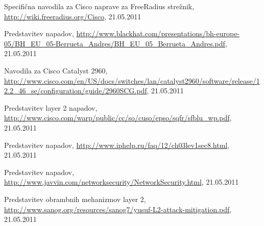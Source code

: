 \documentclass[12pt]{article}
\begin{document}
\begin{thebibliography}{9}
\bibitem{}
Specifična navodila za Cisco naprave za FreeRadius strežnik, \url{http://wiki.freeradius.org/Cisco}, 21.05.2011

\bibitem{}
Predstavitev napadov, \url{http://www.blackhat.com/presentations/bh-europe-05/BH_EU_05-Berrueta_Andres/BH_EU_05_Berrueta_Andres.pdf}, 21.05.2011

\bibitem{}
Navodila za Cisco Catalyst 2960, \url{http://www.cisco.com/en/US/docs/switches/lan/catalyst2960/software/release/12.2_46_se/configuration/guide/2960SCG.pdf}, 21.05.2011

\bibitem{}
Predstavitev layer 2 napadov, \url{http://www.cisco.com/warp/public/cc/so/cuso/epso/sqfr/sfblu_wp.pdf}, 21.05.2011

\bibitem{}
Predstavitev napadov, \url{http://www.iphelp.ru/faq/12/ch03lev1sec8.html}, 21.05.2011

\bibitem{}
Predstavitev napadov, \url{http://www.javvin.com/networksecurity/NetworkSecurity.html}, 21.05.2011

\bibitem{}
Predstavitev obrambnih mehanizmov layer 2, \url{http://www.sanog.org/resources/sanog7/yusuf-L2-attack-mitigation.pdf}, 21.05.2011

\end{thebibliography}
\end{document}
